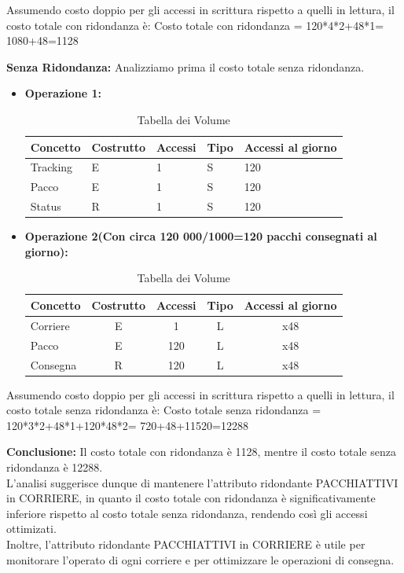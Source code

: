 Assumendo costo doppio per gli accessi in scrittura rispetto a quelli in lettura, il costo totale con ridondanza è:
Costo totale con ridondanza = 120*4*2+48*1= 1080+48=1128

\textbf{Senza Ridondanza:} Analizziamo prima il costo totale senza ridondanza.
\begin{itemize}
    \item \textbf{Operazione 1:} 
     
        \begin{table}[ht]
        \centering
        \begin{tabular} {lllll}
        \toprule
        \textbf{Concetto} & \textbf{Costrutto} & \textbf{Accessi} & \textbf{Tipo} & \textbf{Accessi al giorno}\\ [0.5ex]
        \midrule
            Tracking & E & 1 & S & 120\\
            Pacco & E & 1 & S & 120\\
            Status & R & 1 & S & 120\\ 
        \bottomrule
           \end{tabular}
            \caption{Tabella dei Volume}
    \end{table}

    \item \textbf{Operazione 2(Con circa 120 000/1000=120 pacchi consegnati al giorno):}
        \begin{table}[ht]
        \centering
        \begin{tabular} {lcccc}
        \toprule
        \textbf{Concetto} & \textbf{Costrutto} & \textbf{Accessi} & \textbf{Tipo} & \textbf{Accessi al giorno}\\ [0.5ex]
        \midrule
            Corriere & E & 1 & L & x48\\
            Pacco & E & 120 & L & x48\\
            Consegna & R & 120 & L & x48\\ 
            \bottomrule
           \end{tabular}
            \caption{Tabella dei Volume}
    \end{table}

\end{itemize}
Assumendo costo doppio per gli accessi in scrittura rispetto a quelli in lettura, il costo totale senza ridondanza è:
Costo totale senza ridondanza = 120*3*2+48*1+120*48*2= 720+48+11520=12288

\textbf{Conclusione:} Il costo totale con ridondanza è 1128, mentre il costo totale senza ridondanza è 12288.\\
L'analisi suggerisce dunque di mantenere l'attributo ridondante PACCHIATTIVI in CORRIERE, in quanto il costo totale con ridondanza è significativamente inferiore rispetto al costo totale senza ridondanza, rendendo così gli accessi ottimizati.\\
Inoltre, l'attributo ridondante PACCHIATTIVI in CORRIERE è utile per monitorare l'operato di ogni corriere e per ottimizzare le operazioni di consegna.\\




